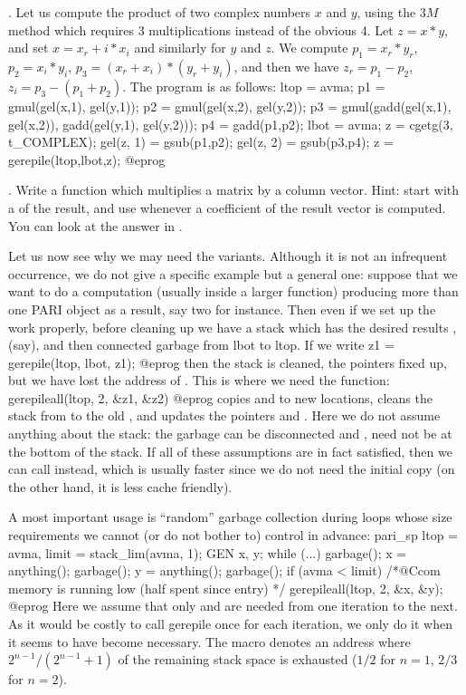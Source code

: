 . Let us compute the product of two complex
numbers $x$ and $y$, using the $3M$ method which requires 3 multiplications
instead of the obvious 4. Let $z = x*y$, and set $x = x_r + i*x_i$ and
similarly for $y$ and $z$. We compute $p_1 = x_r*y_r$, $p_2=x_i*y_i$,
$p_3=(x_r+x_i)*(y_r+y_i)$, and then we have $z_r=p_1-p_2$,
$z_i=p_3-(p_1+p_2)$. The program is as follows:
%
\bprog
ltop = avma;
p1 = gmul(gel(x,1), gel(y,1));
p2 = gmul(gel(x,2), gel(y,2));
p3 = gmul(gadd(gel(x,1), gel(x,2)), gadd(gel(y,1), gel(y,2)));
p4 = gadd(p1,p2);
lbot = avma; z = cgetg(3, t_COMPLEX);
gel(z, 1) = gsub(p1,p2);
gel(z, 2) = gsub(p3,p4); z = gerepile(ltop,lbot,z);
@eprog

. Write a function which multiplies a matrix by a column
vector. Hint: start with a  of the result, and use 
whenever a coefficient of the result vector is computed. You can look at the
answer in .


Let us now see why we may need the  variants. Although it
is not an infrequent occurrence, we do not give a specific example but a
general one: suppose that we want to do a computation (usually inside a
larger function) producing more than one PARI object as a result, say two for
instance. Then even if we set up the work properly, before cleaning up we
have a stack which has the desired results ,  (say), and
then connected garbage from lbot to ltop. If we write
\bprog
  z1 = gerepile(ltop, lbot, z1);
@eprog\noindent
then the stack is cleaned, the pointers fixed up, but we have lost the
address of . This is where we need the 
function:
\bprog
  gerepileall(ltop, 2, &z1, &z2)
@eprog
\noindent copies  and  to new locations, cleans the stack
from  to the old , and updates the pointers  and
. Here we do not assume anything about the stack: the garbage can be
disconnected and ,  need not be at the bottom of the stack.
If all of these assumptions are in fact satisfied, then we can call
 instead, which is usually faster since we do not need
the initial copy (on the other hand, it is less cache friendly).

A most important usage is ``random'' garbage collection during loops
whose size requirements we cannot (or do not bother to) control in advance:
\bprog
  pari_sp ltop = avma, limit = stack_lim(avma, 1);
  GEN x, y;
  while (...)
  {
    garbage(); x = anything();
    garbage(); y = anything(); garbage();
    if (avma < limit) /*@Ccom memory is running low (half spent since entry) */
      gerepileall(ltop, 2, &x, &y);
  }
@eprog
\noindent Here we assume that only  and  are needed from one
iteration to the next. As it would be costly to call gerepile once for each
iteration, we only do it when it seems to have become necessary. The macro
 denotes an address where $2^{n-1} /
(2^{n-1}+1)$ of the remaining stack space is exhausted ($1/2$ for $n=1$,
$2/3$ for $n=2$).

